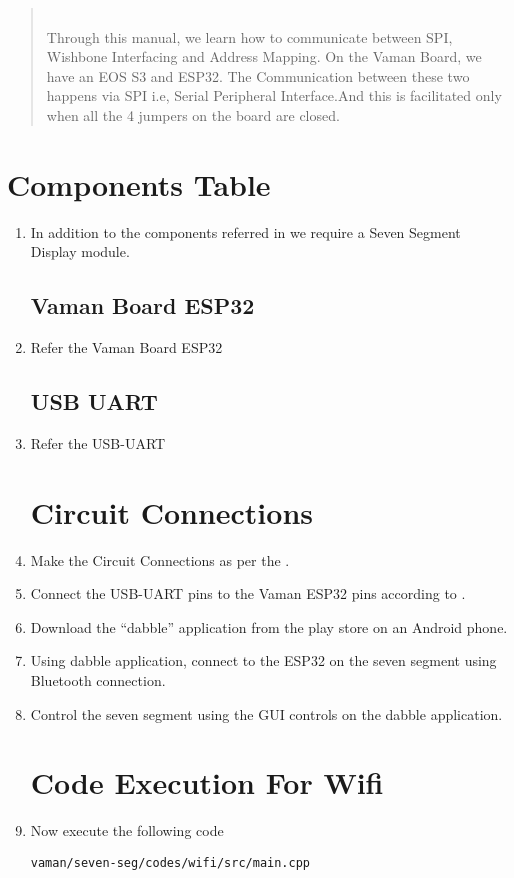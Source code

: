 \begin{abstract}\\
Through this manual, we learn how to communicate between SPI, Wishbone Interfacing and Address Mapping.
On the Vaman Board, we have an EOS S3 and ESP32. The Communication between these two happens via SPI i.e, Serial Peripheral Interface.And this is facilitated only when all the 4 jumpers on the board are closed.
\end{abstract}


\section{Components Table}
\begin{enumerate}[label=\thesection.\arabic*.,ref=\thesection.\theenumi]
\item In addition to the components referred in  we require a Seven Segment Display module.
\subsection{Vaman Board ESP32}
\item Refer the Vaman Board  ESP32 
\subsection{USB UART}
\item Refer the USB-UART 

\section{Circuit Connections}
\item  Make the Circuit Connections as per the . 
\item Connect the USB-UART pins to the Vaman ESP32 pins according to .
\item Download the “dabble” application from the play store on an Android phone.
\item Using dabble application, connect to the ESP32 on the seven segment using Bluetooth connection.
\item Control the seven segment using the GUI controls on the dabble application. 

\section{Code Execution For Wifi}
\raggedright
\item Now execute the following code
\begin{lstlisting}
vaman/seven-seg/codes/wifi/src/main.cpp
\end{lstlisting}


\end{enumerate}
